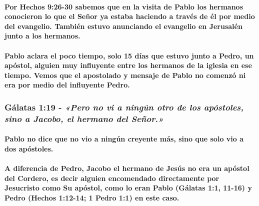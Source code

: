 \documentclass[11a pt,twoside]{article}
\newcommand{\scripture}[1]{%
  {\fontsize{12pt}{16pt}\selectfont\ScriptureFont\itshape #1}%
}
\let\oldsubsubsection\subsubsection
\renewcommand{\subsubsection}{\needspace{4\baselineskip}\oldsubsubsection}
\let\oldparagraph\paragraph
\renewcommand{\paragraph}{\needspace{3\baselineskip}\oldparagraph}
\begin{document}
\paragraph{Por Hechos 9:26-30 sabemos que en la visita de Pablo los
hermanos conocieron lo que el Señor ya estaba haciendo a través de él
por medio del evangelio. También estuvo anunciando el evangelio en
Jerusalén junto a los
hermanos.}\label{por-hechos-926-30-sabemos-que-en-la-visita-de-pablo-los-hermanos-conocieron-lo-que-el-seuxf1or-ya-estaba-haciendo-a-travuxe9s-de-uxe9l-por-medio-del-evangelio.-tambiuxe9n-estuvo-anunciando-el-evangelio-en-jerusaluxe9n-junto-a-los-hermanos.}

\paragraph{Pablo aclara el poco tiempo, solo 15 días que estuvo junto a
Pedro, un apóstol, alguien muy influyente entre los hermanos de la
iglesia en ese tiempo. Vemos que el apostolado y mensaje de Pablo no
comenzó ni era por medio del influyente
Pedro.}\label{pablo-aclara-el-poco-tiempo-solo-15-duxedas-que-estuvo-junto-a-pedro-un-apuxf3stol-alguien-muy-influyente-entre-los-hermanos-de-la-iglesia-en-ese-tiempo.-vemos-que-el-apostolado-y-mensaje-de-pablo-no-comenzuxf3-ni-era-por-medio-del-influyente-pedro.}

\subsubsection{\texorpdfstring{Gálatas 1:19 -
\scripture{«Pero no vi a ningún otro de los apóstoles, sino a Jacobo, el hermano del Señor.»}}{Gálatas 1:19 - }}\label{guxe1latas-119---pero-no-vi-a-ninguxfan-otro-de-los-apuxf3stoles-sino-a-jacobo-el-hermano-del-seuxf1or.}

\paragraph{Pablo no dice que no vio a ningún creyente más, sino que solo
vio a dos
apóstoles.}\label{pablo-no-dice-que-no-vio-a-ninguxfan-creyente-muxe1s-sino-que-solo-vio-a-dos-apuxf3stoles.}

\paragraph{A diferencia de Pedro, Jacobo el hermano de Jesús no era un
apóstol del Cordero, es decir alguien encomendado directamente por
Jesucristo como Su apóstol, como lo eran Pablo (Gálatas 1:1, 11-16) y
Pedro (Hechos 1:12-14; 1 Pedro 1:1) en este
caso.}\label{a-diferencia-de-pedro-jacobo-el-hermano-de-jesuxfas-no-era-un-apuxf3stol-del-cordero-es-decir-alguien-encomendado-directamente-por-jesucristo-como-su-apuxf3stol-como-lo-eran-pablo-guxe1latas-11-11-16-y-pedro-hechos-112-14-1-pedro-11-en-este-caso.}
\end{document}
